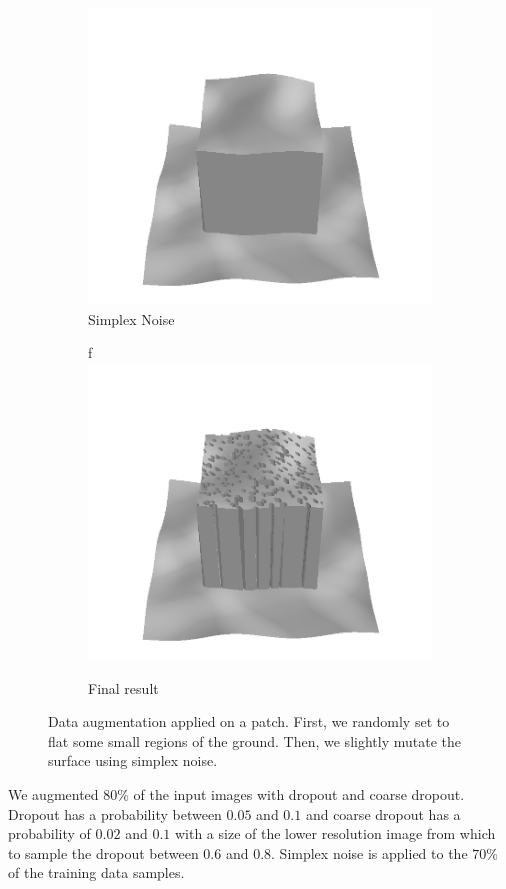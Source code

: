 \documentclass[../document.tex]{subfiles}
\begin{document}
\begin{figure}[htbp]
          \begin{subfigure}[b]{0.32\textwidth}
            \includegraphics[width=\textwidth]{../img/data-aug/3d/center-simplex-mayavi.png}
            \caption{Simplex Noise}

        \end{subfigure}    
        \begin{subfigure}[b]{0.32\textwidth}f
            \includegraphics[width=\textwidth]{../img/data-aug/3d/center-final-mayavi.png}
            \caption{Final result}
        \end{subfigure}    
    \label{fig : data-aug}
    \caption{Data augmentation applied on a patch. First, we randomly set to flat some small regions of the ground. Then, we slightly mutate the surface using simplex noise.}    
\end{figure}
We augmented $80\%$ of the input images with dropout and coarse dropout. Dropout has a probability between $0.05$ and $0.1$ and coarse dropout has a probability of $0.02$ and $0.1$ with a size of the lower resolution image from which to sample the dropout between $0.6$ and $0.8$. Simplex noise is applied to the $70\%$ of the training data samples.
\end{document}
